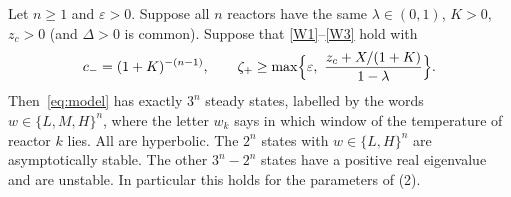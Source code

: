 \documentclass[11pt,a4paper]{report}
\newcommand*{\eps}{\varepsilon}
\begin{document}
\begin{theorem}[note={cascade design}]\label{thm:family}
Let \(n\ge1\) and \(\eps>0\). Suppose all \(n\) reactors have the same \(\lambda\in(0,1)\), \(K>0\), \(z_c>0\) (and
\(\Delta>0\) is common). Suppose that \eqref{W1}--\eqref{W3} hold with
\[
c_-=(1+K)^{-(n-1)},\qquad \zeta_+\ge\max\Bigl\{\eps,\ \frac{z_c+X/(1+K)}{1-\lambda}\Bigr\}.
\]
Then~\eqref{eq:model} has exactly \(3^n\) steady states, labelled by the words \(w\in\{L,M,H\}^n\), where the
letter \(w_k\) says in which window of  the temperature of reactor \(k\) lies. All are hyperbolic. The
\(2^n\) states with \(w\in\{L,H\}^n\) are asymptotically stable. The other \(3^n-2^n\) states have a positive real
eigenvalue and are unstable. In particular this holds for the parameters of (2).
\end{theorem}
\end{document}
